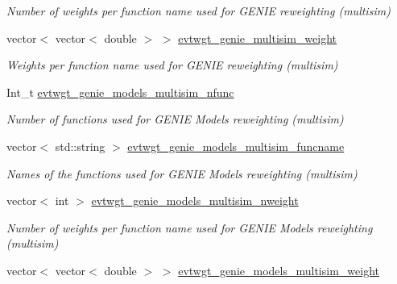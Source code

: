 \begin{DoxyCompactItemize}
\begin{DoxyCompactList}\small\item\em Number of weights per function name used for G\-E\-N\-I\-E reweighting (multisim) \end{DoxyCompactList}\item 
\hypertarget{classUBXSecEvent_a61918cf3a435989606553867c7ade9ae}{vector$<$ vector$<$ double $>$ $>$ \hyperlink{classUBXSecEvent_a61918cf3a435989606553867c7ade9ae}{evtwgt\-\_\-genie\-\_\-multisim\-\_\-weight}}\label{classUBXSecEvent_a61918cf3a435989606553867c7ade9ae}

\begin{DoxyCompactList}\small\item\em Weights per function name used for G\-E\-N\-I\-E reweighting (multisim) \end{DoxyCompactList}\item 
\hypertarget{classUBXSecEvent_ad8d17cd44e668c11eec8802e3e3bc2c3}{Int\-\_\-t \hyperlink{classUBXSecEvent_ad8d17cd44e668c11eec8802e3e3bc2c3}{evtwgt\-\_\-genie\-\_\-models\-\_\-multisim\-\_\-nfunc}}\label{classUBXSecEvent_ad8d17cd44e668c11eec8802e3e3bc2c3}

\begin{DoxyCompactList}\small\item\em Number of functions used for G\-E\-N\-I\-E Models reweighting (multisim) \end{DoxyCompactList}\item 
\hypertarget{classUBXSecEvent_a018d13c6cad75386a88fa19f545a242c}{vector$<$ std\-::string $>$ \hyperlink{classUBXSecEvent_a018d13c6cad75386a88fa19f545a242c}{evtwgt\-\_\-genie\-\_\-models\-\_\-multisim\-\_\-funcname}}\label{classUBXSecEvent_a018d13c6cad75386a88fa19f545a242c}

\begin{DoxyCompactList}\small\item\em Names of the functions used for G\-E\-N\-I\-E Models reweighting (multisim) \end{DoxyCompactList}\item 
\hypertarget{classUBXSecEvent_ae182cfc4b3c05140927035838db25931}{vector$<$ int $>$ \hyperlink{classUBXSecEvent_ae182cfc4b3c05140927035838db25931}{evtwgt\-\_\-genie\-\_\-models\-\_\-multisim\-\_\-nweight}}\label{classUBXSecEvent_ae182cfc4b3c05140927035838db25931}

\begin{DoxyCompactList}\small\item\em Number of weights per function name used for G\-E\-N\-I\-E Models reweighting (multisim) \end{DoxyCompactList}\item 
\hypertarget{classUBXSecEvent_a7ed17743c9088365329dae3edfded289}{vector$<$ vector$<$ double $>$ $>$ \hyperlink{classUBXSecEvent_a7ed17743c9088365329dae3edfded289}{evtwgt\-\_\-genie\-\_\-models\-\_\-multisim\-\_\-weight}}\label{classUBXSecEvent_a7ed17743c9088365329dae3edfded289}


\end{DoxyCompactItemize}
